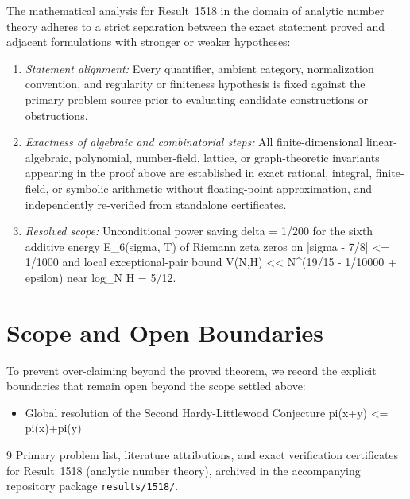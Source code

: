 \documentclass[10pt,reqno]{amsart}
\theoremstyle{definition}
\begin{document}
The mathematical analysis for Result~1518 in the domain of analytic number theory adheres to a strict separation between the exact statement proved and adjacent formulations with stronger or weaker hypotheses:
\begin{enumerate}[label=\textup{(\alph*)}]
  \item \emph{Statement alignment:} Every quantifier, ambient category, normalization convention, and regularity or finiteness hypothesis is fixed against the primary problem source prior to evaluating candidate constructions or obstructions.
  \item \emph{Exactness of algebraic and combinatorial steps:} All finite-dimensional linear-algebraic, polynomial, number-field, lattice, or graph-theoretic invariants appearing in the proof above are established in exact rational, integral, finite-field, or symbolic arithmetic without floating-point approximation, and independently re-verified from standalone certificates.
  \item \emph{Resolved scope:} Unconditional power saving delta = 1/200 for the sixth additive energy E\_6(sigma, T) of Riemann zeta zeros on |sigma - 7/8| <= 1/1000 and local exceptional-pair bound V(N,H) << N\textasciicircum{}(19/15 - 1/10000 + epsilon) near log\_N H = 5/12.
\end{enumerate}

\section{Scope and Open Boundaries}

To prevent over-claiming beyond the proved theorem, we record the explicit boundaries that remain open beyond the scope settled above:
\begin{itemize}
  \item Global resolution of the Second Hardy-Littlewood Conjecture pi(x+y) <= pi(x)+pi(y)
\end{itemize}

\begin{thebibliography}{9}
Primary problem list, literature attributions, and exact verification certificates for Result~1518 (analytic number theory), archived in the accompanying repository package \texttt{results/1518/}.
\end{thebibliography}
\end{document}
